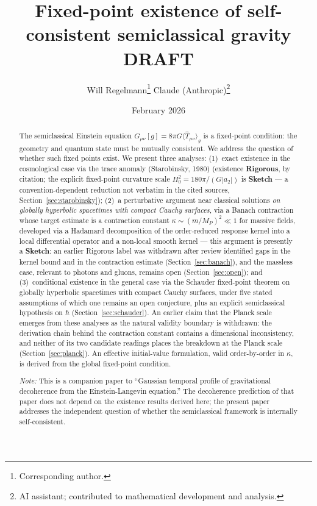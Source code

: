 \documentclass[12pt,a4paper]{article}
\title{\textbf{Fixed-point existence of self-consistent semiclassical gravity}\\[6pt]
{\large DRAFT}}
\author{Will Regelmann\thanks{Corresponding author.} \quad Claude (Anthropic)\thanks{AI
assistant; contributed to mathematical development and analysis.}}
\date{February 2026}
\begin{document}
\maketitle

\begin{abstract}
The semiclassical Einstein equation $G_{\mu\nu}[g] = 8\pi G\langle\hat{T}_{\mu\nu}\rangle_g$
is a fixed-point condition: the geometry and quantum state must be mutually consistent.
We address the question of whether such fixed points exist. We present three analyses:
(1)~exact existence in the cosmological case via the trace anomaly
(Starobinsky, 1980) (existence \textbf{Rigorous}, by citation; the explicit fixed-point
curvature scale $H_0^2 = 180\pi/(G|a_2|)$ is \textbf{Sketch} --- a convention-dependent
reduction not verbatim in the cited sources, Section~\ref{sec:starobinsky}); (2)~a perturbative argument near
classical solutions \emph{on globally hyperbolic spacetimes with compact Cauchy surfaces},
via a Banach contraction whose target estimate is a contraction constant
$\kappa \sim (m/M_P)^2 \ll 1$ for massive fields, developed via a Hadamard decomposition
of the order-reduced response kernel into a local differential operator and a non-local
smooth kernel --- this argument is presently a \textbf{Sketch}: an earlier Rigorous label
was withdrawn after review identified gaps in the kernel bound and in the contraction
estimate (Section~\ref{sec:banach}), and the massless case, relevant to photons and gluons,
remains open (Section~\ref{sec:open}); and (3)~conditional existence in the general
case via the Schauder fixed-point theorem on globally hyperbolic spacetimes with compact
Cauchy surfaces, under five stated assumptions of which one remains an open conjecture,
plus an explicit semiclassical hypothesis on $\hbar$ (Section~\ref{sec:schauder}).
An earlier claim that the Planck scale emerges from these analyses as the natural validity
boundary is withdrawn: the derivation chain behind the contraction constant contains a
dimensional inconsistency, and neither of its two candidate readings places the breakdown
at the Planck scale (Section~\ref{sec:planck}). An effective initial-value formulation,
valid order-by-order in $\kappa$, is derived from the global fixed-point condition.

\bigskip\noindent\textit{Note:} This is a companion paper to ``Gaussian temporal profile
of gravitational decoherence from the Einstein-Langevin equation.'' The decoherence
prediction of that paper does not depend on the existence results derived here; the present
paper addresses the independent question of whether the semiclassical framework is
internally self-consistent.
\end{abstract}
\end{document}
